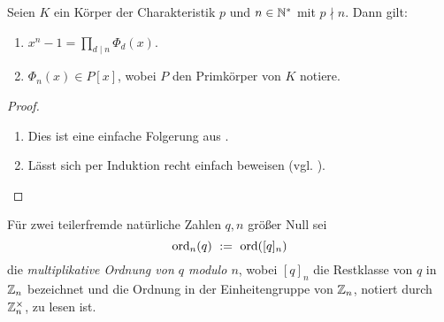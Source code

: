 \begin{satz}
  \label{satz:zerfall_xn_1}
  Seien $K$ ein Körper der Charakteristik $p$ und $n \in \mathbb{N}^\ast$ mit $p\nmid
  n$. Dann gilt:
  \begin{enumerate}
    \item $x^n-1 = \prod_{d\mid n} \Phi_d(x)$.
    \item $\Phi_n(x) \in P[x]$, wobei $P$ den Primkörper von $K$ notiere.
  \end{enumerate}
\end{satz}
\begin{proof}
  \begin{enumerate}
    \item Dies ist eine einfache Folgerung aus .
    \item Lässt sich per Induktion recht einfach beweisen 
      (vgl. \autocite[Theorem 2.45 (ii)]{lidl1997finite}).
  \end{enumerate}
\end{proof}


\begin{definition}
  Für zwei teilerfremde natürliche Zahlen $q,n$ größer Null sei
  \[ \operatorname{ord}_n(q) \ :=\  \operatorname{ord}([q]_n)\]
  die \emph{multiplikative Ordnung von $q$ modulo $n$},
  wobei $[q]_n$ die Restklasse von $q$ in $\mathbb{Z}_n$ bezeichnet und 
  die Ordnung in der Einheitengruppe von $\mathbb{Z}_n$, notiert 
  durch $\mathbb{Z}_n^\times$, zu lesen ist.
\end{definition}

